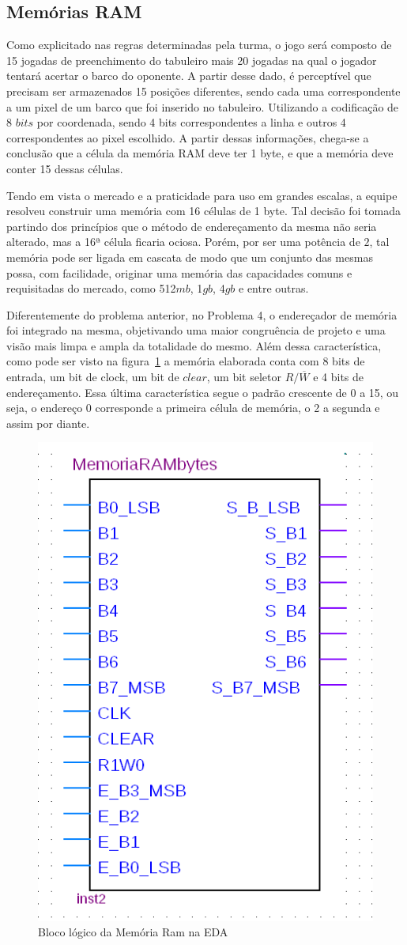 \documentclass[12pt]{article}
\begin{document}
\subsection{Memórias RAM}

Como explicitado nas regras determinadas pela turma, o jogo será composto de 15 jogadas de preenchimento do tabuleiro mais 20 jogadas na qual o jogador tentará acertar o barco do oponente. A partir desse dado, é perceptível que precisam ser armazenados 15 posições diferentes, sendo cada uma correspondente a um pixel de um barco que foi inserido no tabuleiro. Utilizando a codificação de 8 $bits$ por coordenada, sendo 4 bits correspondentes a linha e outros 4 correspondentes ao pixel escolhido. A partir dessas informações, chega-se a conclusão que a célula da memória RAM deve ter 1 byte, e que a memória deve conter 15 dessas células.

Tendo em vista o mercado e a praticidade para uso em grandes escalas, a equipe resolveu construir uma memória com 16 células de 1 byte. Tal decisão foi tomada partindo dos princípios que o método de endereçamento da mesma não seria alterado, mas a 16ª célula ficaria ociosa. Porém, por ser uma potência de $2$, tal memória pode ser ligada em cascata de modo que um conjunto das mesmas possa, com facilidade, originar uma memória das capacidades comuns e requisitadas do mercado, como 512$mb$, 1$gb$, 4$gb$ e entre outras.

Diferentemente do problema anterior, no Problema 4, o endereçador de memória foi integrado na mesma, objetivando uma maior congruência de projeto e uma visão mais limpa e ampla da totalidade do mesmo. Além dessa característica, como pode ser visto na figura~\ref{fig:ram15} a memória elaborada conta com 8 bits de entrada, um bit de clock, um bit de $clear$, um bit seletor $R/\overline{W}$ e 4 bits de endereçamento. Essa última característica segue o padrão crescente de 0 a 15, ou seja, o endereço 0 corresponde a primeira célula de memória, o 2 a segunda e assim por diante.


\begin{figure}[h]
\centering
\includegraphics[width=.3\textwidth]{img/p4/ram15bytes.png}
\caption{Bloco lógico da Memória Ram na EDA}
\label{fig:ram15}
\end{figure}
\end{document}
